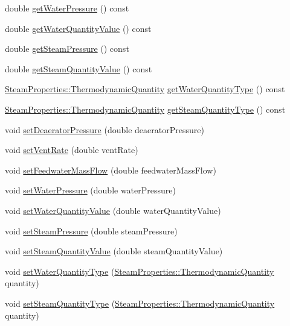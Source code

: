 \begin{DoxyCompactItemize}
double \hyperlink{class_deaerator_ae86ef305a8641d61ec76bd39bb84f28b}{get\+Water\+Pressure} () const
\item 
double \hyperlink{class_deaerator_a9362430fb04802b6f14c9bf09d62a466}{get\+Water\+Quantity\+Value} () const
\item 
double \hyperlink{class_deaerator_aebe779c63cace193d040f497e3b70728}{get\+Steam\+Pressure} () const
\item 
double \hyperlink{class_deaerator_a5473feedca64e7c44143d422ed3e2401}{get\+Steam\+Quantity\+Value} () const
\item 
\hyperlink{class_steam_properties_ae0294bedf7d178c2d8fb6aed0f62fbff}{Steam\+Properties\+::\+Thermodynamic\+Quantity} \hyperlink{class_deaerator_a414282f81906e09a28bc75cf51659ec2}{get\+Water\+Quantity\+Type} () const
\item 
\hyperlink{class_steam_properties_ae0294bedf7d178c2d8fb6aed0f62fbff}{Steam\+Properties\+::\+Thermodynamic\+Quantity} \hyperlink{class_deaerator_a18abbdc5ec78f71e1d2495b0c64c77ec}{get\+Steam\+Quantity\+Type} () const
\item 
void \hyperlink{class_deaerator_a5b20d3aba98b21928cce70b45e843ff3}{set\+Deaerator\+Pressure} (double deaerator\+Pressure)
\item 
void \hyperlink{class_deaerator_a11e71194f58763a57ec0f7d05a21782d}{set\+Vent\+Rate} (double vent\+Rate)
\item 
void \hyperlink{class_deaerator_ada95cb2557bc43602d7bcefbad66c853}{set\+Feedwater\+Mass\+Flow} (double feedwater\+Mass\+Flow)
\item 
void \hyperlink{class_deaerator_ae23f64c6983daed388a73c033a15e176}{set\+Water\+Pressure} (double water\+Pressure)
\item 
void \hyperlink{class_deaerator_ac31cf2deb8bf30ee6921d1d9f8281eb8}{set\+Water\+Quantity\+Value} (double water\+Quantity\+Value)
\item 
void \hyperlink{class_deaerator_a5936221e68b5ba3245f0adabed74e6d7}{set\+Steam\+Pressure} (double steam\+Pressure)
\item 
void \hyperlink{class_deaerator_a101399a8b66c3ff1fecf884fd1b1373d}{set\+Steam\+Quantity\+Value} (double steam\+Quantity\+Value)
\item 
void \hyperlink{class_deaerator_ac60ad3d6650ed6c7783d18833bb7e3dd}{set\+Water\+Quantity\+Type} (\hyperlink{class_steam_properties_ae0294bedf7d178c2d8fb6aed0f62fbff}{Steam\+Properties\+::\+Thermodynamic\+Quantity} quantity)
\item 
void \hyperlink{class_deaerator_a1aa3b3de064d148479af9576e717b6c2}{set\+Steam\+Quantity\+Type} (\hyperlink{class_steam_properties_ae0294bedf7d178c2d8fb6aed0f62fbff}{Steam\+Properties\+::\+Thermodynamic\+Quantity} quantity)

\end{DoxyCompactItemize}
